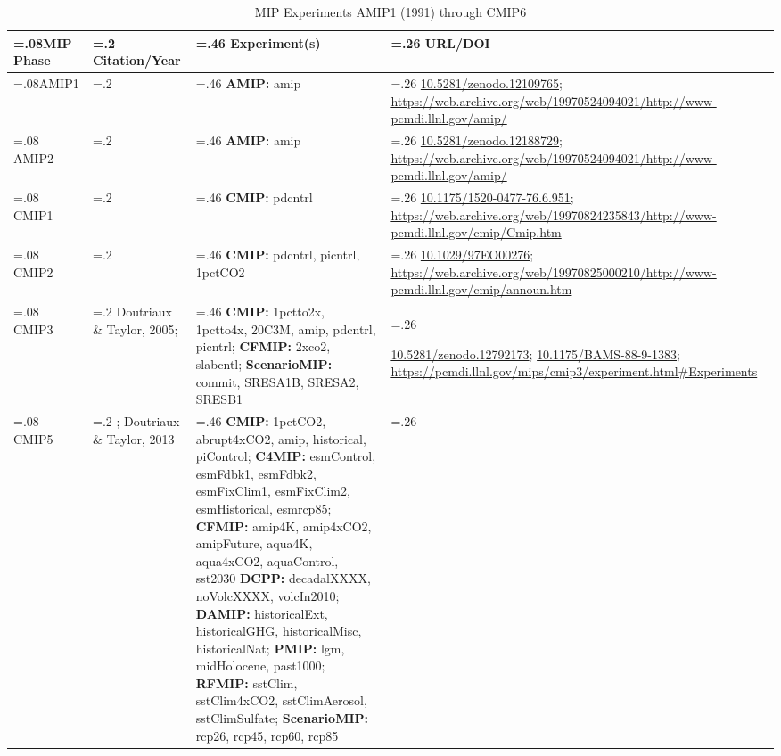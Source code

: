 \documentclass[manuscript]{copernicus}
\begin{document}
\begin{table}[htp]
	\renewcommand{\arraystretch}{1.5}
	\scriptsize
	\centering
	\caption{MIP Experiments AMIP1 (1991) through CMIP6}
	\resizebox{\textwidth}{!} {
		\begin{tabularx}{0.9\textwidth} {
				| >{\centering\arraybackslash\hsize=.08\hsize}X
				| >{\centering\arraybackslash\hsize=.2\hsize}X
				| >{\centering\arraybackslash\hsize=.46\hsize}X
				| >{\centering\arraybackslash\hsize=.26\hsize}X | }
			\hline
			\textbf{MIP Phase} & \textbf{Citation/Year} & \textbf{Experiment(s)} & \textbf{URL/DOI}\\ \hline
			AMIP1 & \citet{gates_amip_1991} & \textbf{AMIP:} amip & \href{http://doi.org/10.5281/zenodo.12109765}{10.5281/zenodo.12109765}; \url{https://web.archive.org/web/19970524094021/http://www-pcmdi.llnl.gov/amip/}\\ \hline
			AMIP2 & \citet{gleckler_amip_1999} & \textbf{AMIP:} amip & \href{http://doi.org/10.5281/zenodo.12188729}{10.5281/zenodo.12188729}; \url{https://web.archive.org/web/19970524094021/http://www-pcmdi.llnl.gov/amip/}\\ \hline
			CMIP1 & \citet{meehl_global_1995} & \textbf{CMIP:} pdcntrl & 
            \href{https://doi.org/10.1175/1520-0477-76.6.951}{10.1175/1520-0477-76.6.951};
            \url{https://web.archive.org/web/19970824235843/http://www-pcmdi.llnl.gov/cmip/Cmip.htm}\\ \hline
			CMIP2 & \citet{meehl_intercomparison_1997} & \textbf{CMIP:} pdcntrl, picntrl, 1pctCO2 &
            \href{https://doi.org/10.1029/97EO00276}{10.1029/97EO00276};         \url{https://web.archive.org/web/19970825000210/http://www-pcmdi.llnl.gov/cmip/announ.htm}\\ \hline
			CMIP3 & Doutriaux \& Taylor, 2005; \citet{meehl_wcrp_2007} & \textbf{CMIP:} 1pctto2x, 1pctto4x, 20C3M, amip, pdcntrl, picntrl; \textbf{CFMIP:} 2xco2, slabcntl; \textbf{ScenarioMIP:} commit, SRESA1B, SRESA2, SRESB1 &

            \href{https://doi.org/10.5281/zenodo.12792173}{10.5281/zenodo.12792173};
            \href{https://doi.org/10.1175/BAMS-88-9-1383}{10.1175/BAMS-88-9-1383};            \url{https://pcmdi.llnl.gov/mips/cmip3/experiment.html\#Experiments}\\ \hline
			CMIP5 & \cite{taylor_cmip5_2011,taylor_overview_2012}; Doutriaux \& Taylor, 2013 & \textbf{CMIP:} 1pctCO2, abrupt4xCO2, amip, historical, piControl; \textbf{C4MIP:} esmControl, esmFdbk1, esmFdbk2, esmFixClim1, esmFixClim2, esmHistorical, esmrcp85; \textbf{CFMIP:} amip4K, amip4xCO2, amipFuture, aqua4K, aqua4xCO2, aquaControl, sst2030 \textbf{DCPP:} decadalXXXX, noVolcXXXX, volcIn2010; \textbf{DAMIP:} historicalExt, historicalGHG, historicalMisc, historicalNat; \textbf{PMIP:} lgm, midHolocene, past1000; \textbf{RFMIP:} sstClim, sstClim4xCO2, sstClimAerosol, sstClimSulfate; \textbf{ScenarioMIP:} rcp26, rcp45, rcp60, rcp85 &
            

\end{tabularx}}
\end{table}
\end{document}

